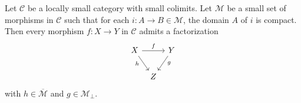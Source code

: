\documentclass[main.tex]{subfiles}
\begin{document}
\begin{lemma}
  \label{lemma:small_object_argument}
  Let $\mathcal{C}$ be a locally small category with small colimits. Let $\mathcal{M}$ be a small set of morphisms in $\mathcal{C}$ such that for each $i\colon A \to B \in \mathcal{M}$, the domain $A$ of $i$ is compact. Then every morphism $f\colon X \to Y$ in $\mathcal{C}$ admits a factorization
  \begin{equation*}
    \begin{tikzcd}[column sep=tiny]
      X
      \arrow[rr, "f"]
      \arrow[rd, swap, near start, "h"]
      && Y
      \arrow[ld, near start, "g"]
      \\
      & Z
    \end{tikzcd}
  \end{equation*}
  with $h \in \overline{\mathcal{M}}$ and $g \in \mathcal{M}_{\perp}$.
\end{lemma}
\end{document}
